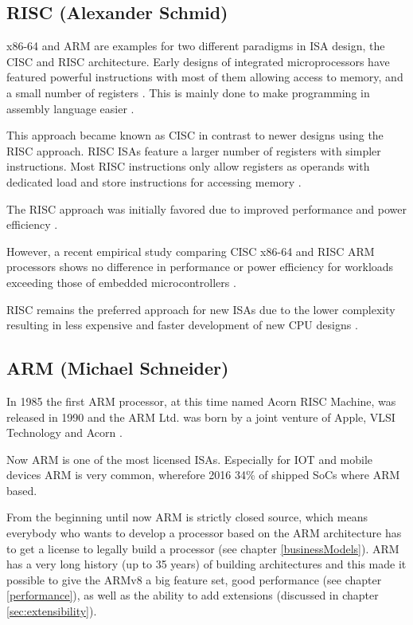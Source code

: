 \documentclass[conference]{IEEEtran}
\begin{document}
	\subsection{RISC (Alexander Schmid)}
	x86-64 and ARM are examples for two different paradigms in \gls{ISA} design, the \gls{CISC} and \gls{RISC} architecture.
	Early designs of integrated microprocessors have featured powerful instructions with most of them allowing access to memory,
	and a small number of registers \cite{George1990}. This is mainly done to make programming in assembly language easier \cite[page 73]{Stokes2006}.

	This approach became known as \gls{CISC} in contrast to newer designs using the \gls{RISC} approach.
	\gls{RISC} \glspl{ISA} feature a larger number of registers with simpler instructions.
	Most \gls{RISC} instructions only allow registers as operands with dedicated load and store instructions for accessing memory \cite{George1990}.

	The \gls{RISC} approach was initially favored due to improved performance and power efficiency \cite{George1990}.
	
	However, a recent empirical study comparing \gls{CISC} x86-64 and \gls{RISC} ARM processors shows no difference in performance or power efficiency
	for workloads exceeding those of embedded microcontrollers \cite{Blem2013}.

	\gls{RISC} remains the preferred approach for new \glspl{ISA} due to the lower complexity resulting in less expensive and faster
	development of new CPU designs \cite{George1990}. 

	\subsection{ARM (Michael Schneider)}
	In 1985 the first ARM processor, at this time named Acorn RISC Machine, was released in 1990 and the ARM Ltd. was born by a joint venture of Apple, VLSI Technology and Acorn \cite{Levy2005}.

	 Now ARM is one of the most licensed \glspl{ISA}. Especially for IOT and mobile devices ARM is very common, wherefore 2016 34\% of shipped SoCs where ARM based. \cite[slide 7-10]{Holdings2018}

	From the beginning until now ARM is strictly closed source, which means everybody who wants to develop a processor based on the ARM architecture has to get a license to legally build a processor (see chapter \ref{businessModels}). ARM has a very long history (up to 35 years) of building architectures and this made it possible to give the ARMv8 a big feature set, good performance (see chapter \ref{performance}), as well as the ability to add extensions (discussed in chapter \ref{sec:extensibility}).
	
\end{document}
